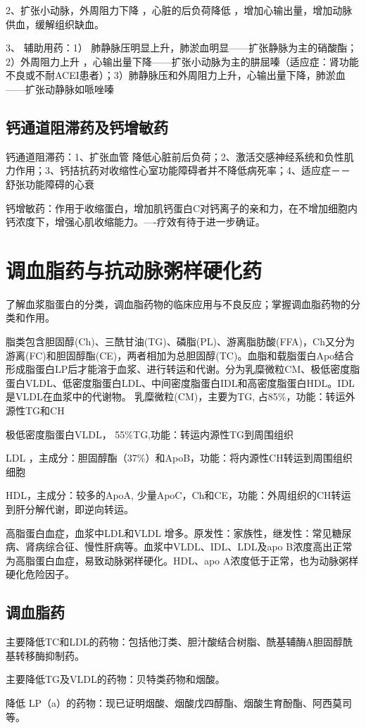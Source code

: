 \documentclass[UTF8]{ctexbook}
\begin{document}
2、扩张小动脉，外周阻力下降 ，心脏的后负荷降低 ，增加心输出量，增加动脉供血，缓解组织缺血。

3、 辅助用药：1） 肺静脉压明显上升，肺淤血明显——扩张静脉为主的硝酸酯；2）外周阻力上升 ，心输出量下降——扩张小动脉为主的肼屈嗪（适应症：肾功能不良或不耐ACEI患者）；3）肺静脉压和外周阻力上升，心输出量下降，肺淤血——扩张动静脉如哌唑嗪
\section{钙通道阻滞药及钙增敏药}
钙通道阻滞药：1、扩张血管 降低心脏前后负荷；2、激活交感神经系统和负性肌力作用；3、钙拮抗药对收缩性心室功能障碍者并不降低病死率；4、适应症－－ 舒张功能障碍的心衰

钙增敏药：作用于收缩蛋白，增加肌钙蛋白C对钙离子的亲和力，在不增加细胞内钙浓度下，增强心肌收缩能力。----疗效有待于进一步确证。
\chapter{调血脂药与抗动脉粥样硬化药}
了解血浆脂蛋白的分类，调血脂药物的临床应用与不良反应；掌握调血脂药物的分类和作用。

脂类包含胆固醇(Ch)、三酰甘油(TG)、磷脂(PL)、游离脂肪酸(FFA)，Ch又分为游离(FC)和胆固醇酯(CE)，两者相加为总胆固醇(TC)。血脂和载脂蛋白Apo结合形成脂蛋白LP后才能溶于血浆、进行转运和代谢。分为乳糜微粒CM、极低密度脂蛋白VLDL、低密度脂蛋白LDL、中间密度脂蛋白IDL和高密度脂蛋白HDL。IDL是VLDL在血浆中的代谢物。
乳糜微粒(CM)，主要为TG, 占85\%，功能：转运外源性TG和CH

极低密度脂蛋白VLDL， 55\%TG,功能：转运内源性TG到周围组织

LDL ，主成分：胆固醇酯（37\%）和ApoB，功能：将内源性CH转运到周围组织细胞

HDL，主成分：较多的ApoA, 少量ApoC，Ch和CE，功能：外周组织的CH转运到肝分解代谢，即逆向转运。

高脂蛋白血症，血浆中LDL和VLDL 增多。原发性：家族性，继发性：常见糖尿病、肾病综合征、慢性肝病等。血浆中VLDL、IDL、LDL及apo B浓度高出正常为高脂蛋白血症，易致动脉粥样硬化。HDL、apo A浓度低于正常，也为动脉粥样硬化危险因子。
\section{调血脂药}
主要降低TC和LDL的药物：包括他汀类、胆汁酸结合树脂、酰基辅酶A胆固醇酰基转移酶抑制药。

主要降低TG及VLDL的药物：贝特类药物和烟酸。

降低 LP（a）的药物：现已证明烟酸、烟酸戊四醇酯、烟酸生育酚酯、阿西莫司等。
\end{document}
